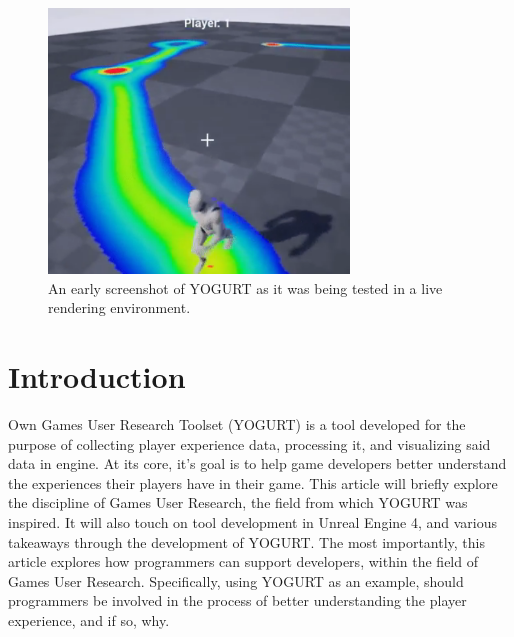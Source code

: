 \documentclass[journal]{IEEEtran}
\begin{document}
\begin{figure}[ht]
\includegraphics[width=8cm]{"testing_live"}
\caption{An early screenshot of YOGURT as it was being tested in a live rendering environment.}
\label{testingLive}
\end{figure}

\section{Introduction}
% 
% 
% 
% 
 Own Games User Research Toolset (YOGURT) is a tool developed for the purpose of collecting player experience data, processing it, and visualizing said data in engine. At its core, it's goal is to help game developers better understand the experiences their players have in their game.
This article will briefly explore the discipline of Games User Research, the field from which YOGURT was inspired. It will also touch on tool development in Unreal Engine 4, and various takeaways through the development of YOGURT. The most importantly, this article explores  how programmers can support developers, within the field of Games User Research. Specifically, using YOGURT as an example, should programmers be involved in the process of better understanding the player experience, and if so, why.
\end{document}
